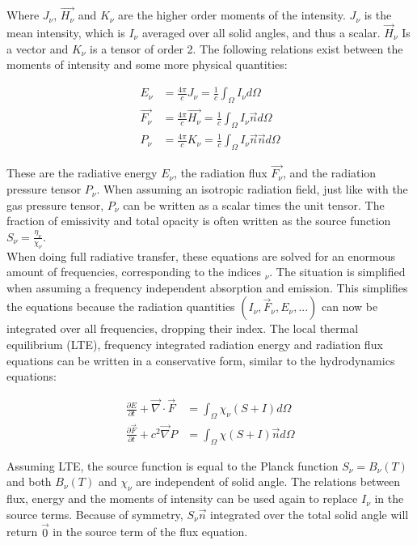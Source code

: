 Where $J_\nu$, $\vec{H_\nu}$ and $K_\nu$ are the higher order moments of the intensity. $J_\nu$ is the mean intensity, which is $I_\nu$ averaged over all solid angles, and thus a scalar. $\vec{H}_\nu$ Is a vector and $K_\nu$ is a tensor of order 2. The following relations exist between the moments of intensity and some more physical quantities:

\begin{align}
E_\nu &= \frac{4 \pi}{c} J_\nu = \frac{1}{c} \int_\Omega I_\nu d \Omega\\
\vec{F_\nu} &= \frac{4 \pi}{c} \vec{H_\nu} = \frac{1}{c} \int_\Omega I_\nu \vec{n} d \Omega\\
P_\nu &= \frac{4 \pi}{c} K_\nu = \frac{1}{c} \int_\Omega I_\nu \vec{n}\vec{n} d \Omega
\end{align}

These are the radiative energy $E_\nu$, the radiation flux $\vec{F_\nu}$, and the radiation pressure tensor $P_\nu$. When assuming an isotropic radiation field, just like with the gas pressure tensor, $P_\nu$ can be written as a scalar times the unit tensor. The fraction of emissivity and total opacity is often written as the source function $S_\nu = \frac{\eta_\nu}{\chi_\nu}$. \\
 When doing full radiative transfer, these equations are solved for an enormous amount of frequencies, corresponding to the indices $_\nu$. The situation is simplified when assuming a frequency independent absorption and emission. This simplifies the equations because the radiation quantities $(I_\nu, \vec{F}_\nu, E_\nu, ...)$ can now be integrated over all frequencies, dropping their index. The local thermal equilibrium (LTE), frequency integrated radiation energy and radiation flux equations can be written in a conservative form, similar to the hydrodynamics equations: 

\begin{align}
\frac{\partial E}{\partial t} + \vec{\nabla} \cdot \vec{F} &= \int_\Omega \chi_\nu \left( S + I \right) d\Omega \label{eq: E_si}\\
\frac{\partial \vec{F}}{\partial t} + c^2 \vec{\nabla} P &= \int_\Omega \chi \left( S + I \right) \vec{n} d\Omega \label{F_si}
\end{align}

Assuming LTE, the source function is equal to the Planck function $S_\nu = B_\nu(T)$ and both $B_\nu(T)$ and $\chi_\nu$ are independent of solid angle. The relations between flux, energy and the moments of intensity can be used again to replace $I_\nu$ in the source terms. Because of symmetry, $S_\nu \vec{n}$ integrated over the total solid angle will return $\vec{0}$ in the source term of the flux equation.\\

